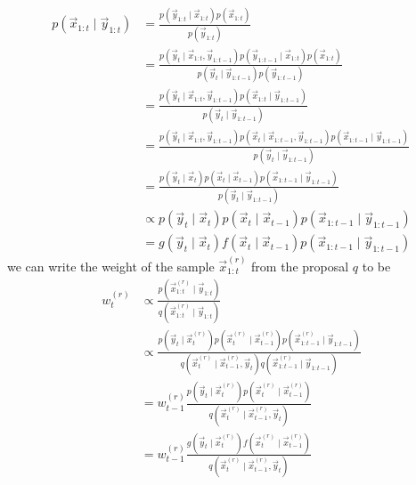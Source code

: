     \begin{align}
        p(\vec x_{1:t} \mid \vec y_{1:t})   &= \frac{p(\vec y_{1:t} \mid \vec x_{1:t}) p(\vec x_{1:t})}{p(\vec y_{1:t})} \\
                                            &= \frac{p(\vec y_t \mid \vec x_{1:t}, \vec y_{1:t - 1}) p(\vec y_{1:t - 1} \mid \vec x_{1:t}) p(\vec x_{1:t})}{p(\vec y_t \mid \vec y_{1:t - 1}) p(\vec y_{1:t - 1})} \\
                                            &= \frac{p(\vec y_t \mid \vec x_{1:t}, \vec y_{1:t - 1}) p(\vec x_{1:t} \mid \vec y_{1:t - 1})}{p(\vec y_t \mid \vec y_{1:t - 1})} \\
                                            &= \frac{p(\vec y_t \mid \vec x_{1:t}, \vec y_{1:t - 1}) p(\vec x_t \mid \vec x_{1:t - 1}, \vec y_{1:t - 1}) p(\vec x_{1:t - 1} \mid \vec y_{1:t - 1})}{p(\vec y_t \mid \vec y_{1:t - 1})} \\
                                            &= \frac{p(\vec y_t \mid \vec x_t) p(\vec x_t \mid \vec x_{t - 1}) p(\vec x_{1:t - 1} \mid \vec y_{1:t - 1})}{p(\vec y_t \mid \vec y_{1:t - 1})} \\
                                            &\propto p(\vec y_t \mid \vec x_t) p(\vec x_t \mid \vec x_{t - 1}) p(\vec x_{1:t - 1} \mid \vec y_{1:t - 1}) \\
                                            &= g(\vec y_t \mid \vec x_t) f(\vec x_t \mid \vec x_{t - 1}) p(\vec x_{1:t - 1} \mid \vec y_{1:t - 1}) 
    \end{align}
    we can write the weight of the sample $\vec x_{1:t}^{(r)}$ from the proposal $q$ to be
    \begin{align}
        w_t^{(r)}   &\propto \frac{p\left(\vec x_{1:t}^{(r)} \mid \vec y_{1:t}\right)}{q\left(\vec x_{1:t}^{(r)} \mid \vec y_{1:t}\right)} \\
                    &\propto \frac{p\left(\vec y_t \mid \vec x_t^{(r)}\right) p\left(\vec x_t^{(r)} \mid \vec x_{t - 1}^{(r)}\right) p\left(\vec x_{1:t - 1}^{(r)} \mid \vec y_{1:t - 1}\right)}{q\left(\vec x_t^{(r)} \mid \vec x_{t-1}^{(r)}, \vec y_t\right) q\left(\vec x_{1:t-1}^{(r)} \mid \vec y_{1:t - 1}\right)} \\
                    &= w_{t - 1}^{(r)} \frac{p\left(\vec y_t \mid \vec x_t^{(r)}\right) p\left(\vec x_t^{(r)} \mid \vec x_{t - 1}^{(r)}\right)}{q\left(\vec x_t^{(r)} \mid \vec x_{t - 1}^{(r)}, \vec y_t\right)} \\
                    &= w_{t - 1}^{(r)} \frac{g\left(\vec y_t \mid \vec x_t^{(r)}\right) f\left(\vec x_t^{(r)} \mid \vec x_{t - 1}^{(r)}\right)}{q\left(\vec x_t^{(r)} \mid \vec x_{t - 1}^{(r)}, \vec y_t\right)} \label{eq:weights}
    \end{align}
